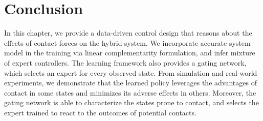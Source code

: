 \section{Conclusion}
\label{sec:moe_conclusion}

In this chapter, we provide a data-driven control design that reasons about the
effects of contact forces on the hybrid system.
%
We incorporate accurate system model in the training via linear complementarity
formulation, and infer mixture of expert controllers.
%
The learning framework also provides a gating network, which selects an expert
for every observed state.
%
From simulation and real-world experiments, we demonstrate that the learned
policy leverages the advantages of contact in some states and minimizes its
adverse effects in others.
%
Moreover, the gating network is able to characterize the states prone to
contact, and selects the expert trained to react to the outcomes of potential
contacts.

